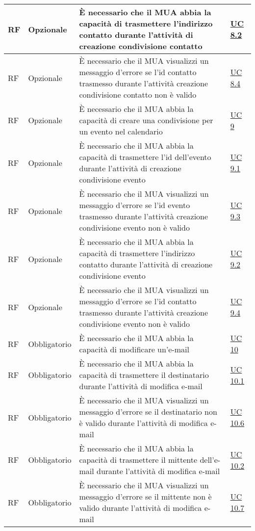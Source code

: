 \begin{longtable}{*{1}{>{\centering\arraybackslash}p{1.5cm}}*{1}{>{\centering\arraybackslash}p{2.5cm}}p{6cm}*{1}{>{\centering\arraybackslash}p{3cm}}}
    \\\hline
    RF & Opzionale & È necessario che il MUA abbia la capacità di trasmettere l'indirizzo contatto durante l'attività di creazione condivisione contatto & \hyperref[sec:UC8.2]{UC 8.2}
    \\\hline
    RF & Opzionale & È necessario che il MUA visualizzi un messaggio d'errore se l'id contatto trasmesso durante l'attività creazione condivisione contatto non è valido & \hyperref[sec:UC8.4]{UC 8.4}
    \\\hline
    RF & Opzionale & È necessario che il MUA abbia la capacità di creare una condivisione per un evento nel calendario & \hyperref[sec:UC9]{UC 9}
    \\\hline
    RF & Opzionale & È necessario che il MUA abbia la capacità di trasmettere l'id dell'evento durante l'attività di creazione condivisione evento & \hyperref[sec:UC9.1]{UC 9.1}
    \\\hline
    RF & Opzionale & È necessario che il MUA visualizzi un messaggio d'errore se l'id evento trasmesso durante l'attività creazione condivisione evento non è valido & \hyperref[sec:UC9.3]{UC 9.3}
    \\\hline
    RF & Opzionale & È necessario che il MUA abbia la capacità di trasmettere l'indirizzo contatto durante l'attività di creazione condivisione evento & \hyperref[sec:UC9.2]{UC 9.2}
    \\\hline
    RF & Opzionale & È necessario che il MUA visualizzi un messaggio d'errore se l'id contatto trasmesso durante l'attività creazione condivisione evento non è valido & \hyperref[sec:UC9.4]{UC 9.4}
    \\\hline
    RF & Obbligatorio & È necessario che il MUA abbia la capacità di modificare un'e-mail & \hyperref[sec:UC10]{UC 10}
    \\\hline
    RF & Obbligatorio & È necessario che il MUA abbia la capacità di trasmettere il destinatario durante l'attività di modifica e-mail & \hyperref[sec:UC10.1]{UC 10.1}
    \\\hline
    RF & Obbligatorio & È necessario che il MUA visualizzi un messaggio d'errore se il destinatario non è valido durante l'attività di modifica e-mail & \hyperref[sec:UC10.6]{UC 10.6}
    \\\hline
    RF & Obbligatorio & È necessario che il MUA abbia la capacità di trasmettere il mittente dell'e-mail durante l'attività di modifica e-mail & \hyperref[sec:UC10.2]{UC 10.2}
    \\\hline
    RF & Obbligatorio & È necessario che il MUA visualizzi un messaggio d'errore se il mittente non è valido durante l'attività di modifica e-mail & \hyperref[sec:UC10.7]{UC 10.7}

\end{longtable}
